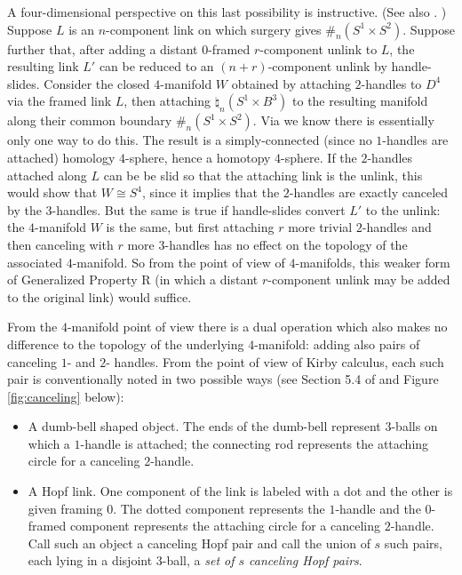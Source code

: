 \documentclass{amsart}
\begin{document}
A four-dimensional perspective on this last possibility is instructive.  (See also \cite[Section 3]{FGMW}. ) Suppose $L$ is an $n$-component link on which surgery gives $\#_{n} (S^{1} \times S^{2})$.  Suppose further that, after adding a distant $0$-framed $r$-component unlink to $L$, the resulting link $L'$  can be reduced to an $(n+r)$-component unlink by handle-slides.  Consider the closed $4$-manifold $W$ obtained by attaching $2$-handles to $D^4$ via the framed link $L$, then attaching $\natural_{n} (S^{1} \times B^{3})$ to the resulting manifold along their common boundary $\#_{n} (S^{1} \times S^{2})$. Via \cite{LP} we know there is essentially only one way to do this.  The result is a simply-connected (since no $1$-handles are attached) homology $4$-sphere, hence a homotopy $4$-sphere.  If the $2$-handles attached along $L$ can be be slid so that the attaching link is the unlink, this would show that $W \cong S^4$, since it implies that the $2$-handles are exactly canceled by the $3$-handles.  But the same is true if handle-slides convert $L'$ to the unlink: the $4$-manifold $W$ is the same, but first attaching $r$ more trivial $2$-handles and then canceling with $r$ more $3$-handles has no effect on the topology of the associated $4$-manifold.  So from the point of view of $4$-manifolds, this weaker form of Generalized Property R (in which a distant $r$-component unlink may be added to the original link) would suffice.

From the $4$-manifold point of view there is a dual operation which also makes no difference to the topology of the underlying $4$-manifold: adding also pairs of canceling $1$- and $2$- handles.  From the point of view of Kirby calculus, each such pair is conventionally noted in two possible ways (see Section 5.4 of \cite{GS} and Figure \ref{fig:canceling} below):
\bigskip

\begin{itemize}

\item A dumb-bell shaped object.  The ends of the dumb-bell represent $3$-balls on which a $1$-handle is attached; the connecting rod represents the attaching circle for a canceling $2$-handle.

\bigskip

\item A Hopf link.  One component of the link is labeled with a dot and the other is given framing $0$.  The dotted component represents the $1$-handle and the $0$-framed component represents the attaching circle for a canceling $2$-handle.  Call such an object a canceling Hopf pair and call the union of $s$ such pairs, each lying in a disjoint $3$-ball, a {\em set of $s$ canceling Hopf pairs}.
\end{itemize}
\end{document}
